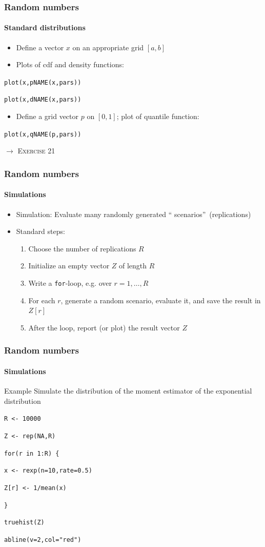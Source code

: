 \documentclass[title={Introduction to R}, author={Mutschler and Zaharieva}, inst={Institute for Econometrics and Empirical Economics}]{beamer}
\begin{document}
\begin{frame}
\frametitle{Random numbers}
\framesubtitle{Standard distributions}
\begin{itemize}
\item Define a vector $x$ on an appropriate grid $[a,b]$
\item Plots of cdf and density functions:
\end{itemize}
\begin{center}
\texttt{plot(x,pNAME(x,pars))}

\texttt{plot(x,dNAME(x,pars))}
\end{center}
\begin{itemize}
\item Define a grid vector $p$ on $[0,1]$; plot of quantile function:
\end{itemize}
\begin{center}
\texttt{plot(x,qNAME(p,pars))}
\end{center}\pause
$\longrightarrow $ \textsc{Exercise 21}
\end{frame}


\begin{frame}
\frametitle{Random numbers}
\framesubtitle{Simulations}
\begin{itemize}
\item Simulation: Evaluate many randomly generated \textquotedblleft
scenarios\textquotedblright\ (replications)
\item Standard steps:
\begin{enumerate}
\item Choose the number of replications $R$
\item Initialize an empty vector $Z$ of length $R$
\item Write a \texttt{for}-loop, e.g. over $r=1,\ldots ,R$
\item For each $r$, generate a random scenario, evaluate it, and save the result in $Z[r]$
\item After the loop, report (or plot) the result vector $Z$
\end{enumerate}
\end{itemize}
\end{frame}


\begin{frame}
\frametitle{Random numbers}
\framesubtitle{Simulations}
\begin{block}{Example}
Simulate the distribution of the moment estimator of the exponential
distribution\bigskip

\texttt{R <- 10000}

\texttt{Z <- rep(NA,R)}

\texttt{for(r in 1:R) \{}

\quad \texttt{x <- rexp(n=10,rate=0.5)}

\quad \texttt{Z[r] <- 1/mean(x)}

\texttt{\}}

\texttt{truehist(Z)}

\texttt{abline(v=2,col="red")}
\end{block}
\end{frame}
\end{document}
